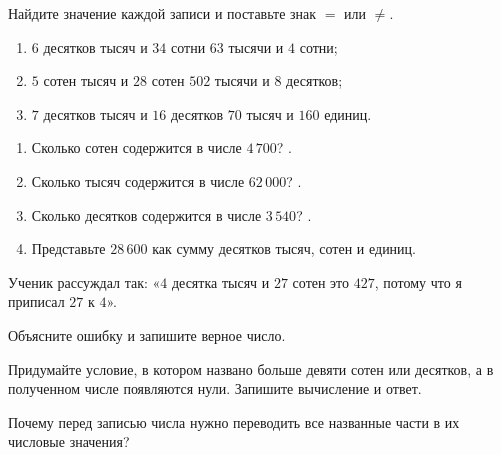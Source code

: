 \begin{fillbox}
  Найдите значение каждой записи и поставьте знак \(=\) или \(\ne\).
  \begin{enumerate}[label=\textbf{\arabic*.}]
    \item \(6\) десятков тысяч и \(34\) сотни
      \answerblank[12mm]
      \(63\) тысячи и \(4\) сотни;
    \item \(5\) сотен тысяч и \(28\) сотен
      \answerblank[12mm]
      \(502\) тысячи и \(8\) десятков;
    \item \(7\) десятков тысяч и \(16\) десятков
      \answerblank[12mm]
      \(70\) тысяч и \(160\) единиц.
  \end{enumerate}
\end{fillbox}

\begin{practicebox}
  \begin{enumerate}[label=\textbf{\arabic*.}]
    \item Сколько сотен содержится в числе \(4\,700\)? \answerblank[20mm].
    \item Сколько тысяч содержится в числе \(62\,000\)? \answerblank[20mm].
    \item Сколько десятков содержится в числе \(3\,540\)? \answerblank[20mm].
    \item Представьте \(28\,600\) как сумму десятков тысяч, сотен и единиц.
  \end{enumerate}
\end{practicebox}

\begin{warningbox}
  Ученик рассуждал так: «\(4\) десятка тысяч и \(27\) сотен \textemdash{} это
  \(427\), потому что я приписал \(27\) к \(4\)».

  Объясните ошибку и запишите верное число.
\end{warningbox}

\begin{practicebox}
  Придумайте условие, в котором названо больше девяти сотен или десятков, а в
  полученном числе появляются нули. Запишите вычисление и ответ.
\end{practicebox}

\begin{checkpointbox}[Обобщение]
  Почему перед записью числа нужно переводить все названные части в их
  числовые значения?
\end{checkpointbox}
